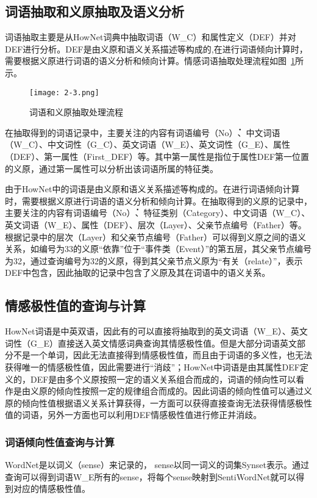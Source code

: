 \subsection{词语抽取和义原抽取及语义分析}
词语抽取主要是从HowNet词典中抽取词语（W\_C）和属性定义（DEF）并对DEF进行分析。DEF是由义原和语义关系描述等构成的,在进行词语倾向计算时，需要根据义原进行词语的语义分析和倾向计算。情感词语抽取处理流程如图~\ref{atom}所示。

\begin{figure}[htp]
\centering
\texttt{[image: 2-3.png]}
\caption{词语和义原抽取处理流程}
\label{atom}
\end{figure}

在抽取得到的词语记录中，主要关注的内容有词语编号（No\.）、中文词语（W\_C）、中文词性（G\_C）、英文词语（W\_E）、英文词性（G\_E）、属性（DEF）、第一属性（First\_DEF）等。其中第一属性是指位于属性DEF第一位置的义原，通过第一属性可以分析出该词语所属的特征类。

由于HowNet中的词语是由义原和语义关系描述等构成的。在进行词语倾向计算时，需要根据义原进行词语的语义分析和倾向计算。在抽取得到的义原的记录中，主要关注的内容有词语编号（No\.）、特征类别（Category）、中文词语（W\_C）、英文词语（W\_E）、属性（DEF）、层次（Layer）、父亲节点编号（Father）等。根据记录中的层次（Layer）和父亲节点编号（Father）可以得到义原之间的语义关系，如编号为33的义原“依靠”位于“事件类（Event）”的第五层，其父亲节点编号为32，通过查询编号为32的义原，得到其父亲节点义原为“有关（relate）”，表示DEF中包含，因此抽取的记录中包含了义原及其在词语中的语义关系。

\subsection{情感极性值的查询与计算}
HowNet词语是中英双语，因此有的可以直接将抽取到的英文词语（W\_E）、英文词性（G\_E）直接送入英文情感词典查询其情感极性值。但是大部分词语英文部分不是一个单词，因此无法直接得到情感极性值，而且由于词语的多义性，也无法获得唯一的情感极性值，因此需要进行“消歧”；HowNet中词语是由其属性DEF定义的，DEF是由多个义原按照一定的语义关系组合而成的，词语的倾向性可以看作是由义原的倾向性按照一定的规律组合而成的。因此词语的倾向性值可以通过义原的倾向性值根据语义关系计算获得，一方面可以获得直接查询无法获得情感极性值的词语，另外一方面也可以利用DEF情感极性值进行修正并消歧。

\subsubsection{词语倾向性值查询与计算}
\label{sense}
WordNet是以词义（sense）来记录的， sense以同一词义的词集Synset表示。通过查询可以得到词语W\_E所有的sense，将每个sense映射到SentiWordNet就可以得到对应的情感极性值。

